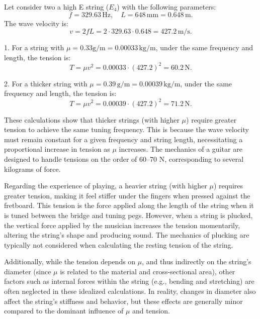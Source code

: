 \documentclass[a4paper]{article}
\begin{document}
Let consider two a high E string (\(E_4\)) with the following parameters:
   \[
   f = 329.63 \, \text{Hz}, \quad L = 648 \, \text{mm} = 0.648 \, \text{m}.
   \]
The wave velocity is:
   \[
   v = 2fL = 2 \cdot 329.63 \cdot 0.648 = 427.2 \, \text{m/s}.
   \]

1. For a string with \( \mu = 0.33 \text{g/m} = 0.00033 \, \text{kg/m} \), under the same frequency and length, the tension is:
   \[
   T = \mu v^2 = 0.00033 \cdot (427.2)^2 = 60.2 \, \text{N}.
   \]

2. For a thicker string with \(\mu = 0.39 \, \text{g/m} = 0.00039 \, \text{kg/m}\), under the same frequency and length, the tension is:
   \[
   T = \mu v^2 = 0.00039 \cdot (427.2)^2 = 71.2 \, \text{N}.
   \]

These calculations show that thicker strings (with higher \(\mu\)) require greater tension to achieve the same tuning frequency. This is because the wave velocity must remain constant for a given frequency and string length, necessitating a proportional increase in tension as \(\mu\) increases. The mechanics of a guitar are designed to handle tensions on the order of 60–70 N, corresponding to several kilograms of force. 

Regarding the experience of playing, a heavier string (with higher \(\mu\)) requires greater tension, making it feel stiffer under the fingers when pressed against the fretboard. This tension is the force applied along the length of the string when it is tuned between the bridge and tuning pegs. However, when a string is plucked, the vertical force applied by the musician increases the tension momentarily, altering the string's shape and producing sound. The mechanics of plucking are typically not considered when calculating the resting tension of the string.

Additionally, while the tension depends on \(\mu\), and thus indirectly on the string's diameter (since \(\mu\) is related to the material and cross-sectional area), other factors such as internal forces within the string (e.g., bending and stretching) are often neglected in these idealized calculations. In reality, changes in diameter also affect the string's stiffness and behavior, but these effects are generally minor compared to the dominant influence of \(\mu\) and tension. \\
\end{document}
